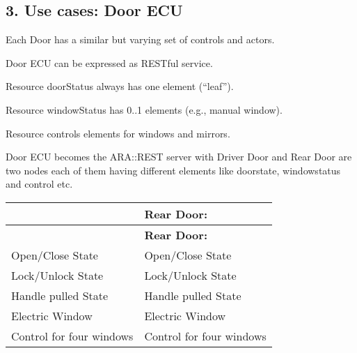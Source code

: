 \subsection*{3. Use cases\+: Door E\+CU}


\begin{DoxyItemize}
\item Each Door has a similar but varying set of controls and actors.
\item Door E\+CU can be expressed as R\+E\+S\+Tful service.
\item Resource door\+Status always has one element (“leaf”).
\item Resource window\+Status has 0..1 elements (e.\+g., manual window).
\item Resource controls elements for windows and mirrors.
\item Door E\+CU becomes the A\+R\+A\+::\+R\+E\+ST server with Driver Door and Rear Door are two nodes each of them having different elements like doorstate, windowstatus and control etc. \tabulinesep=1mm
\begin{longtabu} spread 0pt [c]{*2{|X[-1]}|}
\hline
{}&{\bf Rear Door\+:  }\\
\endfirsthead
\hline
\endfoot
\hline
{}&{\bf Rear Door\+:  }\\
\endhead
Open/\+Close State &Open/\+Close State \\
Lock/\+Unlock State &Lock/\+Unlock State \\
Handle pulled State &Handle pulled State \\
Electric Window &Electric Window \\
Control for four windows &Control for four windows \\
\end{longtabu}


\end{DoxyItemize}
